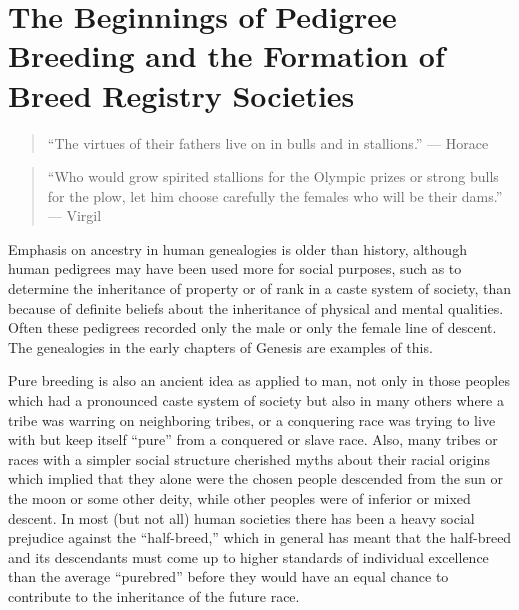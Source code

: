\chapter[Beginnings of Pedigree Breeding and Registry Societies]{The Beginnings of Pedigree Breeding and the Formation of Breed Registry Societies}
\label{cha:breed-registry-societies}

\begin{quote}
``The virtues of their fathers live on in bulls and in stallions.'' --- Horace
\end{quote}

\begin{quote}
``Who would grow spirited stallions for the Olympic prizes or strong bulls for the plow, let him choose carefully 
the females who will be their dams.'' --- Virgil
\end{quote}

Emphasis on ancestry in human genealogies is older than history, although human pedigrees may have been used more for 
social purposes, such as to determine the inheritance of property or of rank in a caste system of society, than because of 
definite beliefs about the inheritance of physical and mental qualities. Often these pedigrees recorded only the male or 
only the female line of descent. The genealogies in the early chapters of Genesis are examples of this. 

Pure breeding is also an ancient idea as applied to man, not only in those peoples which had a pronounced caste system of 
society but also in many others where a tribe was warring on neighboring tribes, or a conquering race was trying to live 
with but keep itself ``pure'' from a conquered or slave race. Also, many tribes or races with a simpler social structure 
cherished myths about their racial origins which implied that they alone were the chosen people descended from the sun or 
the moon or some other deity, while other peoples were of inferior or mixed descent. In most (but not all) human societies 
there has been a heavy social prejudice against the ``half-breed,'' which in general has meant that the half-breed and its 
descendants must come up to higher standards of individual excellence than the average ``purebred'' before they would have 
an equal chance to contribute to the inheritance of the future race. 

